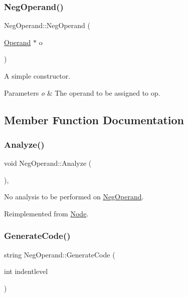 \subsubsection{\texorpdfstring{Neg\+Operand()}{NegOperand()}}
{\footnotesize\ttfamily Neg\+Operand\+::\+Neg\+Operand (\begin{DoxyParamCaption}\item[{\hyperlink{class_operand}{Operand} $\ast$}]{o }\end{DoxyParamCaption})}

A simple constructor. 
\begin{DoxyParams}{Parameters}
{\em o} & The operand to be assigned to op. \\
\hline
\end{DoxyParams}


\subsection{Member Function Documentation}
\mbox{\label{class_neg_operand_a4b7facfe7b6947f5ae0118866b5c013e}} 
\subsubsection{\texorpdfstring{Analyze()}{Analyze()}}
{\footnotesize\ttfamily void Neg\+Operand\+::\+Analyze (\begin{DoxyParamCaption}{ }\end{DoxyParamCaption})\hspace{0.3cm}{\ttfamily [inline]}, {\ttfamily [virtual]}}

No analysis to be performed on \hyperlink{class_neg_operand}{Neg\+Operand}. 

Reimplemented from \hyperlink{class_node_a5f88d55c6f253a29def7ccc443d83d47}{Node}.

\mbox{\label{class_neg_operand_ab205694eabcb30ce4b70e80022b1e751}} 
\subsubsection{\texorpdfstring{Generate\+Code()}{GenerateCode()}}
{\footnotesize\ttfamily string Neg\+Operand\+::\+Generate\+Code (\begin{DoxyParamCaption}\item[{int}]{indentlevel }\end{DoxyParamCaption})\hspace{0.3cm}{\ttfamily [virtual]}}

